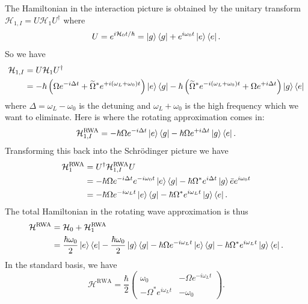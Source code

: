 \documentclass{book}
\theoremstyle{definition}
\newcommand{\ham}{\mathcal{H}}
\newcommand{\f}[2]{\frac{#1}{#2}}
\newcommand{\lp}{\left(}
\newcommand{\rp}{\right)}
\begin{document}
The Hamiltonian in the interaction picture is obtained by the unitary transform $\ham_{1,I} = U \ham_1 U^\dagger$ where
\begin{equation*}
U = e^{i \ham_0 t/\hbar} = \ket{g}\bra{g} + e^{i\omega_0 t}\ket{e}\bra{e}.
\end{equation*}
So we have
\begin{align*}
\ham_{1,I} &= U \ham_1 U^\dagger\\
&= -\hbar \lp \Omega e^{-i\Delta t} + \widetilde{\Omega}^*e^{+i(\omega_L + \omega_0) t} \rp \ket{e}\bra{g} - \hbar\lp \widetilde{\Omega}^* e^{-i(\omega_L  + \omega_0)t} + \Omega e^{+i\Delta t} \rp \ket{g}\bra{e}
\end{align*}
where $\Delta = \omega_L - \omega_0$ is the detuning and $\omega_L + \omega_0$ is the high frequency which we want to eliminate. Here is where the rotating approximation comes in: 
\begin{equation*}
\ham_{1,I}^{\text{RWA}} = -\hbar \Omega e^{-i\Delta t}  \ket{e}\bra{g} - \hbar\Omega e^{+i\Delta t}  \ket{g}\bra{e}.
\end{equation*} 
Transforming this back into the Schr\"{o}dinger picture we have
\begin{align*}
\ham_1^\text{RWA} &= U^\dagger\ham_{1,I}^{\text{RWA}}U \\
&= -\hbar \Omega e^{-i\Delta t}e^{-i \omega_0 t}\ket{e}\bra{g} - \hbar \Omega^* e^{i\Delta t}\ket{g}\bar{e}e^{i\omega_0 t}\\
&= -\hbar \Omega e^{-i\omega_L t}\ket{e}\bra{g} - \hbar \Omega^* e^{i\omega_L t}\ket{g}\bra{e}.
\end{align*}
The total Hamiltonian in the rotating wave approximation is thus
\begin{align*}
\ham^\text{RWA} &= \ham_0+ \ham_1^\text{RWA} \\
&= \f{\hbar \omega_0}{2}\ket{e}\bra{e} - \f{\hbar \omega_0}{2}\ket{g}\bra{g} -\hbar \Omega e^{-i\omega_L t}\ket{e}\bra{g} - \hbar \Omega^* e^{i\omega_L t}\ket{g}\bra{e}.
\end{align*}
In the standard basis, we have
\begin{equation*}
\ham^\text{RWA} =  \f{\hbar}{2} \begin{pmatrix}
\omega_0 & -\Omega e^{-i\omega_L t} \\ -\Omega^* e^{i\omega_L t} & -\omega_0
\end{pmatrix}.
\end{equation*}
\end{document}
